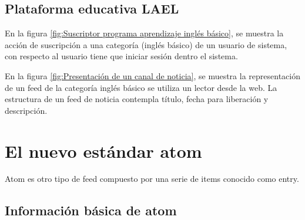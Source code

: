 \begin{minipage}{1.0\linewidth}
	\centering
	\label{fig:Estructura de un documento RSS simple como un diagrama de árbol}
\end{minipage}

\subsection{Plataforma educativa LAEL}

En la figura \ref{fig:Suscriptor programa aprendizaje inglés básico}, se
muestra la acción de suscripción a una categoría (inglés básico) de un
usuario de sistema, con respecto al usuario tiene que iniciar sesión dentro
el sistema. 

\begin{minipage}{1.0\linewidth}
	\centering
	\label{fig:Suscriptor programa aprendizaje inglés básico}
\end{minipage}

En la figura \ref{fig:Presentación de un canal de noticia}, se muestra la
representación de un feed de la categoría inglés básico se utiliza un lector
desde la web. La estructura de un feed de noticia contempla título, fecha
para liberación y descripción.
 
\begin{minipage}{1.0\linewidth}
	\centering
	\label{fig:Presentación de un canal de noticia}
\end{minipage}

\section{El nuevo estándar atom}

Atom es otro tipo de feed compuesto por una serie de items
conocido como entry.

\subsection{Información básica de atom}


